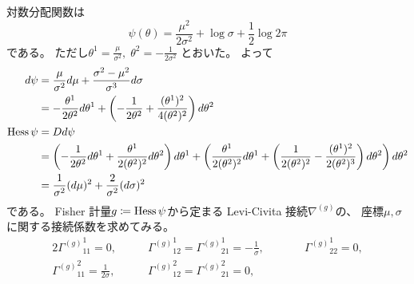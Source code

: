 \documentclass[report]{jlreq}
\begin{document}
\begin{example}[正規分布族]
    対数分配関数は
    \begin{equation}
        \psi(\theta)
            = \frac{\mu^2}{2 \sigma^2}
            + \log \sigma
            + \frac{1}{2} \log 2\pi
    \end{equation}
    である。
    ただし$\theta^1 = \frac{\mu}{\sigma^2}, \;
        \theta^2 = -\frac{1}{2 \sigma^2}$
    とおいた。
    よって
    \begin{alignat}{1}
        d\psi
            &=
                \frac{\mu}{\sigma^2}
                d\mu
                + \frac{\sigma^2 - \mu^2}{\sigma^3}
                d\sigma
                \\
            &=
                -\frac{\theta^1}{2\theta^2} d\theta^1
                +\left({
                    -\frac{1}{2\theta^2}
                    + \frac{(\theta^1)^2}{4(\theta^2)^2}
                }\right)
                d\theta^2
                \\
        \operatorname{Hess}\psi
            &= Dd\psi \\
            &=
                \left({
                    -\frac{1}{2\theta^2}
                    d\theta^1
                    + \frac{\theta^1}{2(\theta^2)^2}
                    d\theta^2
                }\right)
                d\theta^1
                +
                \left({
                    \frac{\theta^1}{2(\theta^2)^2}
                    d\theta^1
                    + \left({
                        \frac{1}{2(\theta^2)^2}
                        - \frac{(\theta^1)^2}{2(\theta^2)^3}
                    }\right)
                    d\theta^2
                }\right)
                d\theta^2
                \\
            &=
                \frac{1}{\sigma^2} (d\mu)^2
                + \frac{2}{\sigma^2} (d\sigma)^2
    \end{alignat}
    である。
    Fisher 計量$g \coloneqq \operatorname{Hess}\psi$から定まる
    Levi-Civita 接続$\nabla^{(g)}$の、
    座標$\mu, \sigma$に関する接続係数を求めてみる。
    \begin{alignat}{2}
        {\Gamma^{(g)}}_{11}^1
            = 0,
            &\qquad
                {\Gamma^{(g)}}_{12}^1
                    = {\Gamma^{(g)}}_{21}^1
                    = -\frac{1}{\sigma},
            &&\qquad
                {\Gamma^{(g)}}_{22}^1
                    = 0,
            \\
        {\Gamma^{(g)}}_{11}^2
            = \frac{1}{2\sigma},
            &\qquad
                {\Gamma^{(g)}}_{12}^2
                    = {\Gamma^{(g)}}_{21}^2
                    = 0,

\end{alignat}
\end{example}
\end{document}
